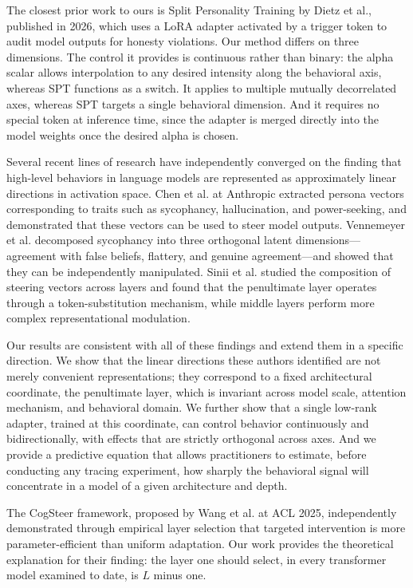 \documentclass[11pt,a4paper]{article}
\begin{document}
The closest prior work to ours is Split Personality Training by Dietz et al., published in 2026, which uses a LoRA adapter activated by a trigger token to audit model outputs for honesty violations. Our method differs on three dimensions. The control it provides is continuous rather than binary: the alpha scalar allows interpolation to any desired intensity along the behavioral axis, whereas SPT functions as a switch. It applies to multiple mutually decorrelated axes, whereas SPT targets a single behavioral dimension. And it requires no special token at inference time, since the adapter is merged directly into the model weights once the desired alpha is chosen.

Several recent lines of research have independently converged on the finding that high-level behaviors in language models are represented as approximately linear directions in activation space. Chen et al. at Anthropic extracted persona vectors corresponding to traits such as sycophancy, hallucination, and power-seeking, and demonstrated that these vectors can be used to steer model outputs. Vennemeyer et al. decomposed sycophancy into three orthogonal latent dimensions---agreement with false beliefs, flattery, and genuine agreement---and showed that they can be independently manipulated. Sinii et al. studied the composition of steering vectors across layers and found that the penultimate layer operates through a token-substitution mechanism, while middle layers perform more complex representational modulation.

Our results are consistent with all of these findings and extend them in a specific direction. We show that the linear directions these authors identified are not merely convenient representations; they correspond to a fixed architectural coordinate, the penultimate layer, which is invariant across model scale, attention mechanism, and behavioral domain. We further show that a single low-rank adapter, trained at this coordinate, can control behavior continuously and bidirectionally, with effects that are strictly orthogonal across axes. And we provide a predictive equation that allows practitioners to estimate, before conducting any tracing experiment, how sharply the behavioral signal will concentrate in a model of a given architecture and depth.

The CogSteer framework, proposed by Wang et al. at ACL 2025, independently demonstrated through empirical layer selection that targeted intervention is more parameter-efficient than uniform adaptation. Our work provides the theoretical explanation for their finding: the layer one should select, in every transformer model examined to date, is $L$ minus one.
\end{document}

